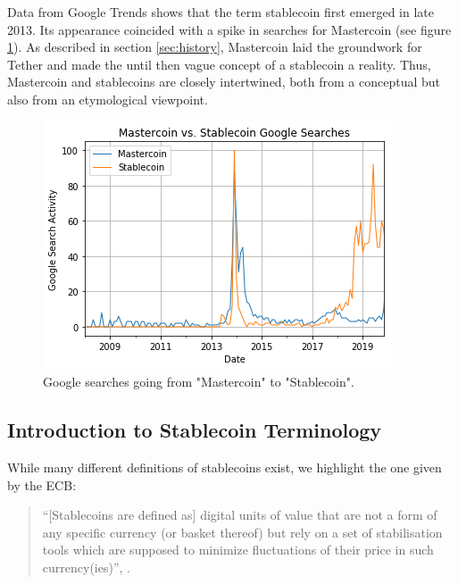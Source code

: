 \documentclass[conference]{IEEEtran}
\begin{document}
Data from Google Trends shows that the term stablecoin first emerged in late 2013. Its appearance coincided with a spike in searches for Mastercoin (see figure \ref{fig:mastercoin}). As described in section \ref{sec:history}, Mastercoin laid the groundwork for Tether and made the until then vague concept of a stablecoin a reality. Thus, Mastercoin and stablecoins are closely intertwined, both from a conceptual but also from an etymological viewpoint.

\begin{figure}[htbp]
	\centerline{
		\includegraphics[width=\linewidth]{assets/googleSearchActivity.png}
		}
	\caption{Google searches going from "Mastercoin" to "Stablecoin".}
	\label{fig:mastercoin}
\end{figure}

\subsection{Introduction to Stablecoin Terminology}
While many different definitions of stablecoins exist, we highlight the one given by the \ac{ECB}:

\begin{quote}
	\textquotedblleft [Stablecoins are defined as] digital units of value that are not a form of any specific currency (or basket thereof) but rely on a set of stabilisation tools which are supposed to minimize fluctuations of their price in such currency(ies)\textquotedblright, \cite{ECB}.
\end{quote}
\end{document}
